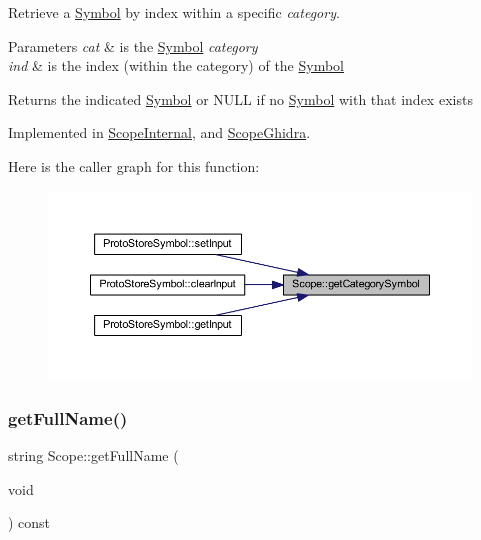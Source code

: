 Retrieve a \mbox{\hyperlink{class_symbol}{Symbol}} by index within a specific {\itshape category}. 


\begin{DoxyParams}{Parameters}
{\em cat} & is the \mbox{\hyperlink{class_symbol}{Symbol}} {\itshape category} \\
\hline
{\em ind} & is the index (within the category) of the \mbox{\hyperlink{class_symbol}{Symbol}} \\
\hline
\end{DoxyParams}
\begin{DoxyReturn}{Returns}
the indicated \mbox{\hyperlink{class_symbol}{Symbol}} or N\+U\+LL if no \mbox{\hyperlink{class_symbol}{Symbol}} with that index exists 
\end{DoxyReturn}


Implemented in \mbox{\hyperlink{class_scope_internal_af0414fde624b56947bfa25863ea1a01e}{Scope\+Internal}}, and \mbox{\hyperlink{class_scope_ghidra_aa3b3e331ed319e74af4a5927f7e70660}{Scope\+Ghidra}}.

Here is the caller graph for this function\+:
\nopagebreak
\begin{figure}[H]
\begin{center}
\leavevmode
\includegraphics[width=350pt]{class_scope_a491a168d7ea71f00da419dd864901ccb_icgraph}
\end{center}
\end{figure}
\mbox{\label{class_scope_a6e0c1eab94766936cb73686e39b2ab6d}} 
\subsubsection{\texorpdfstring{getFullName()}{getFullName()}}
{\footnotesize\ttfamily string Scope\+::get\+Full\+Name (\begin{DoxyParamCaption}\item[{void}]{ }\end{DoxyParamCaption}) const}



